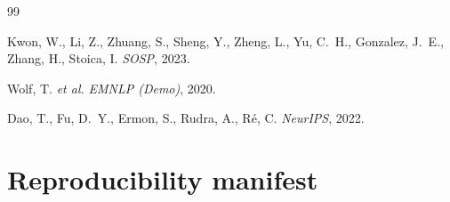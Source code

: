 \documentclass[10pt,a4paper]{article}
\theoremstyle{definition}
\theoremstyle{plain}
\begin{document}
\begin{thebibliography}{99}

Kwon, W., Li, Z., Zhuang, S., Sheng, Y., Zheng, L., Yu, C.~H., Gonzalez, J.~E., Zhang, H., Stoica, I.
\newblock \emph{SOSP}, 2023.

Wolf, T. \emph{et al.}
\newblock \emph{EMNLP (Demo)}, 2020.

Dao, T., Fu, D.~Y., Ermon, S., Rudra, A., R\'e, C.
\newblock \emph{NeurIPS}, 2022.

\end{thebibliography}

\appendix

\section{Reproducibility manifest}
\label{app:repro}
\end{document}
